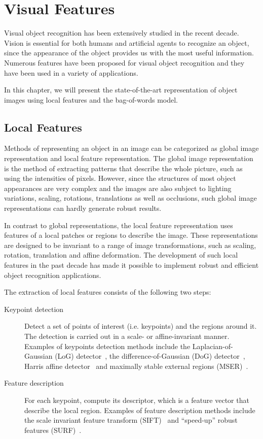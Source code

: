 \documentclass[12pt,final,twoside]{report}
\begin{document}
\cleardoublepage

\chapter{Visual Features}
\label{ch:visual}

Visual object recognition has been extensively studied in the recent decade. Vision is essential for both humans and artificial agents to recognize an object, since the appearance of the object provides us with the most useful information. Numerous features have been proposed for visual object recognition and they have been used in a variety of applications.

In this chapter, we will present the state-of-the-art representation of object images using local features and the bag-of-words model.

\section{Local Features}
Methods of representing an object in an image can be categorized as global image representation and local feature representation. The global image representation is the method of extracting patterns that describe the whole picture, such as using the intensities of pixels. However, since the structures of most object appearances are very complex and the images are also subject to lighting variations, scaling, rotations, translations as well as occlusions, such global image representations can hardly generate robust results. 

In contrast to global representations, the local feature representation uses features of a local patches or regions to describe the image. These representations are designed to be invariant to a range of image transformations, such as scaling, rotation, translation and affine deformation. The development of such local features in the past decade has made it possible to implement robust and efficient object recognition applications.

The extraction of local features consists of the following two steps: 
\begin{description}
  \item[Keypoint detection] Detect a set of points of interest (i.e. keypoints) and the regions around it. The detection is carried out in a scale- or affine-invariant manner. Examples of keypoints detection methods include the Laplacian-of-Gaussian (LoG) detector~\cite{lindeberg_feature_1998}, the difference-of-Gaussian (DoG) detector~\cite{lowe_object_1999}, Harris affine detector~\cite{mikolajczyk_scale_2004} and maximally stable external regions (MSER)~\cite{matas_robust_2004}. 
  \item[Feature description] For each keypoint, compute its descriptor, which is a feature vector that describe the local region. Examples of feature description methods include the scale invariant feature transform (SIFT)~\cite{lowe_object_1999} and ``speed-up'' robust features (SURF)~\cite{bay_speeded-up_2008}.
\end{description}
\end{document}
